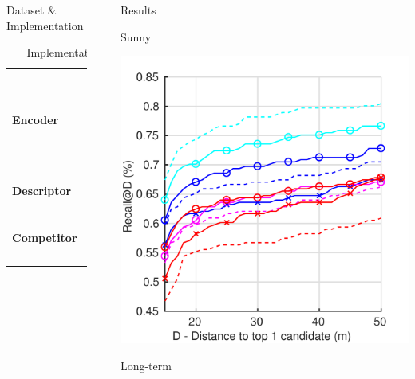 \documentclass[final]{beamer}
\newlength{\sepwidth}
\newlength{\colwidth}
\newcommand{\separatorcolumn}{\begin{column}{\sepwidth}\end{column}}
\begin{document}
\begin{frame}[t]
\begin{columns}[t]
\begin{column}{\colwidth}
\begin{block}{Dataset \& Implementation}
	\begin{table}
  \begin{tabular}{l l}
    \multirow{2}{*}{\textbf{Encoder}} & Alexnet, small network (A) \\
    										 & Resnet18, huge network (Rt) \\
    \hline
    \multirow{2}{*}{\textbf{Descriptor}} & MAC~\cite{Radenovic2017} \\
    											 & NetVLAD~\cite{Arandjelovic2017} \\
    \hline    											
    \multirow{2}{*}{\textbf{Competitor}} & Only RGB \\
                      							   & Hallucination network~\cite{Hoffman2016} \\			  
  \end{tabular}
  \caption{Implementation details}
  \end{table}
		
  \end{block}
\end{column}

\separatorcolumn

\begin{column}{\colwidth}
  \begin{block}{Results}
  		\begin{minipage}{0.49\linewidth}
	  		\centering
	  		Sunny
	  		
			\includegraphics[width=\linewidth]{vect/res/sunny}
		\end{minipage}\hfill
		\begin{minipage}{0.49\linewidth}
	  		\centering
			Long-term
			

\end{minipage}
\end{block}
\end{column}
\end{columns}
\end{frame}
\end{document}
